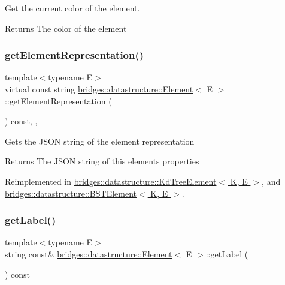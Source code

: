 Get the current color of the element. 

\begin{DoxyReturn}{Returns}
The color of the element 
\end{DoxyReturn}
\mbox{\label{classbridges_1_1datastructure_1_1_element_a285fc51d6dfcb8bff2d72f7e4addfe6d}} 
\subsubsection{\texorpdfstring{get\+Element\+Representation()}{getElementRepresentation()}}
{\footnotesize\ttfamily template$<$typename E$>$ \\
virtual const string \hyperlink{classbridges_1_1datastructure_1_1_element}{bridges\+::datastructure\+::\+Element}$<$ E $>$\+::get\+Element\+Representation (\begin{DoxyParamCaption}{ }\end{DoxyParamCaption}) const\hspace{0.3cm}{\ttfamily [inline]}, {\ttfamily [protected]}, {\ttfamily [virtual]}}

Gets the J\+S\+ON string of the element representation \begin{DoxyReturn}{Returns}
The J\+S\+ON string of this element\textquotesingle{}s properties 
\end{DoxyReturn}


Reimplemented in \hyperlink{classbridges_1_1datastructure_1_1_kd_tree_element_a5413ecaf152e3df5fb45dd85da812888}{bridges\+::datastructure\+::\+Kd\+Tree\+Element$<$ K, E $>$}, and \hyperlink{classbridges_1_1datastructure_1_1_b_s_t_element_a8f962a01b6e0eff59abeee7768264fd9}{bridges\+::datastructure\+::\+B\+S\+T\+Element$<$ K, E $>$}.

\mbox{\label{classbridges_1_1datastructure_1_1_element_a44949edf79379a4d48490e98c15992a6}} 
\subsubsection{\texorpdfstring{get\+Label()}{getLabel()}}
{\footnotesize\ttfamily template$<$typename E$>$ \\
string const\& \hyperlink{classbridges_1_1datastructure_1_1_element}{bridges\+::datastructure\+::\+Element}$<$ E $>$\+::get\+Label (\begin{DoxyParamCaption}{ }\end{DoxyParamCaption}) const\hspace{0.3cm}{\ttfamily [inline]}}

